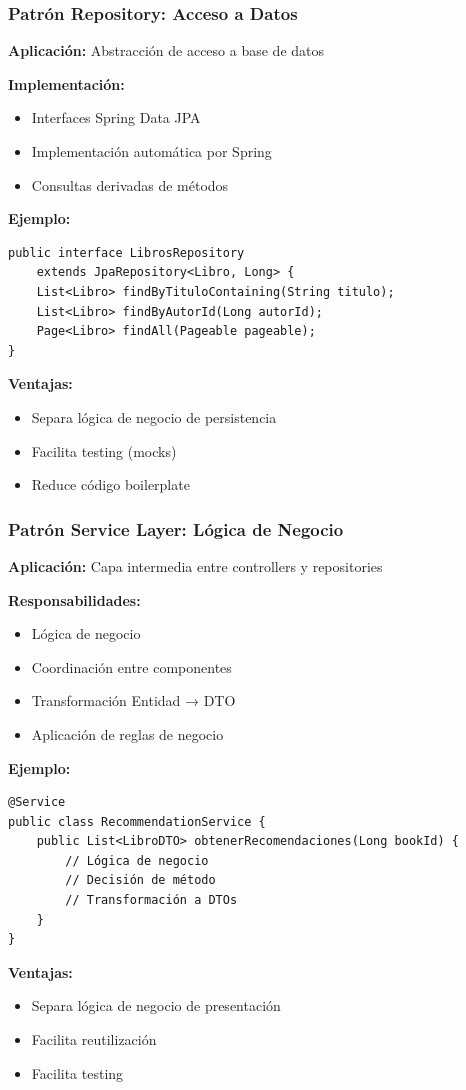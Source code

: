 \documentclass[aspectratio=169]{beamer}
\begin{document}
\begin{frame}
\frametitle{Patrón Repository: Acceso a Datos}

\textbf{Aplicación:} Abstracción de acceso a base de datos

\textbf{Implementación:}
\begin{itemize}
\item Interfaces Spring Data JPA
\item Implementación automática por Spring
\item Consultas derivadas de métodos
\end{itemize}

\textbf{Ejemplo:}
\begin{verbatim}
public interface LibrosRepository 
    extends JpaRepository<Libro, Long> {
    List<Libro> findByTituloContaining(String titulo);
    List<Libro> findByAutorId(Long autorId);
    Page<Libro> findAll(Pageable pageable);
}
\end{verbatim}

\textbf{Ventajas:}
\begin{itemize}
\item Separa lógica de negocio de persistencia
\item Facilita testing (mocks)
\item Reduce código boilerplate
\end{itemize}

\end{frame}

\begin{frame}
\frametitle{Patrón Service Layer: Lógica de Negocio}

\textbf{Aplicación:} Capa intermedia entre controllers y repositories

\textbf{Responsabilidades:}
\begin{itemize}
\item Lógica de negocio
\item Coordinación entre componentes
\item Transformación Entidad → DTO
\item Aplicación de reglas de negocio
\end{itemize}

\textbf{Ejemplo:}
\begin{verbatim}
@Service
public class RecommendationService {
    public List<LibroDTO> obtenerRecomendaciones(Long bookId) {
        // Lógica de negocio
        // Decisión de método
        // Transformación a DTOs
    }
}
\end{verbatim}

\textbf{Ventajas:}
\begin{itemize}
\item Separa lógica de negocio de presentación
\item Facilita reutilización
\item Facilita testing
\end{itemize}

\end{frame}
\end{document}
